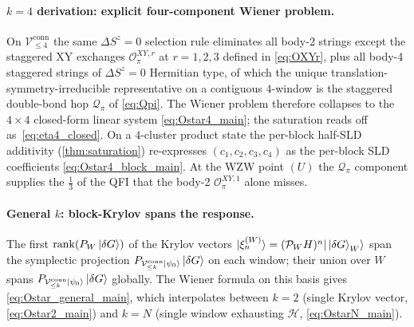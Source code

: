 \documentclass[11pt,a4paper]{article}
\newcommand{\PsiZ}{\ket{\psi_0}}
\newcommand{\dG}{\ket{\delta G}}
\newcommand{\Vconn}[1]{\mathcal{V}^{\mathrm{conn}}_{\le #1}}
\begin{document}
\paragraph{$k=4$ derivation: explicit four-component Wiener
problem.}
On $\Vconn{4}$ the same $\Delta S^z=0$ selection rule eliminates
all body-2 strings except the staggered XY exchanges
$\mathcal O^{XY,r}_\pi$ at $r=1,2,3$ defined in
\eqref{eq:OXYr}, plus all body-4 staggered strings of
$\Delta S^z=0$ Hermitian type, of which the unique
translation-symmetry-irreducible representative on a contiguous
$4$-window is the staggered double-bond hop $\mathcal Q_\pi$ of
\eqref{eq:Qpi}.  The Wiener problem therefore collapses to the
$4\times 4$ closed-form linear system \eqref{eq:Ostar4_main}; the
saturation reads off as~\eqref{eq:eta4_closed}.  On a
$4$-cluster product state the per-block half-SLD additivity
(\cref{thm:saturation}) re-expresses
$(c_1,c_2,c_3,c_4)$ as the per-block SLD coefficients
\eqref{eq:Ostar4_block_main}.  At the WZW point $(U)$ the
$\mathcal Q_\pi$ component supplies the $\frac13$ of the QFI that
the body-2 $\mathcal O^{XY,1}_\pi$ alone misses.

\paragraph{General $k$: block-Krylov spans the response.}
The first $\mathrm{rank}(P_W\dG)$ of the Krylov vectors
$|\xi^{(W)}_n\rangle=(\mathcal P_W H)^n|\dG_W\rangle$ span the
symplectic projection $P_{\Vconn{k}\PsiZ}\dG$ on each window;
their union over $W$ spans $P_{\Vconn{k}\PsiZ}\dG$ globally.  The
Wiener formula on this basis gives \eqref{eq:Ostar_general_main},
which interpolates between $k=2$ (single Krylov vector,
\eqref{eq:Ostar2_main}) and $k=N$ (single window exhausting
$\mathcal H$, \eqref{eq:OstarN_main}).
\end{document}
